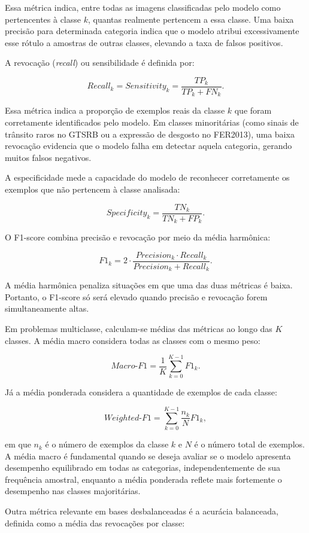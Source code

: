 \documentclass[
    12pt,
    openright,
    oneside,
    a4paper,
    english,
    brazil
]{abntex2}
\begin{document}
Essa métrica indica, entre todas as imagens classificadas pelo modelo como pertencentes à classe \(k\), quantas realmente pertencem a essa classe. Uma baixa precisão para determinada categoria indica que o modelo atribui excessivamente esse rótulo a amostras de outras classes, elevando a taxa de falsos positivos.

A revocação (\textit{recall}) ou sensibilidade é definida por:

\[
Recall_k = Sensitivity_k =
\frac{TP_k}{TP_k + FN_k}.
\]

Essa métrica indica a proporção de exemplos reais da classe \(k\) que foram corretamente identificados pelo modelo. Em classes minoritárias (como sinais de trânsito raros no GTSRB ou a expressão de desgosto no FER2013), uma baixa revocação evidencia que o modelo falha em detectar aquela categoria, gerando muitos falsos negativos.

A especificidade mede a capacidade do modelo de reconhecer corretamente os exemplos que não pertencem à classe analisada:

\[
Specificity_k =
\frac{TN_k}{TN_k + FP_k}.
\]

O F1-score combina precisão e revocação por meio da média harmônica:

\[
F1_k =
2 \cdot
\frac{Precision_k \cdot Recall_k}
{Precision_k + Recall_k}.
\]

A média harmônica penaliza situações em que uma das duas métricas é baixa. Portanto, o F1-score só será elevado quando precisão e revocação forem simultaneamente altas.

Em problemas multiclasse, calculam-se médias das métricas ao longo das \(K\) classes. A média macro considera todas as classes com o mesmo peso:

\[
Macro\text{-}F1 =
\frac{1}{K}
\sum_{k=0}^{K-1}
F1_k.
\]

Já a média ponderada considera a quantidade de exemplos de cada classe:

\[
Weighted\text{-}F1 =
\sum_{k=0}^{K-1}
\frac{n_k}{N}
F1_k,
\]

em que \(n_k\) é o número de exemplos da classe \(k\) e \(N\) é o número total de exemplos. A média macro é fundamental quando se deseja avaliar se o modelo apresenta desempenho equilibrado em todas as categorias, independentemente de sua frequência amostral, enquanto a média ponderada reflete mais fortemente o desempenho nas classes majoritárias.

Outra métrica relevante em bases desbalanceadas é a acurácia balanceada, definida como a média das revocações por classe:
\end{document}
